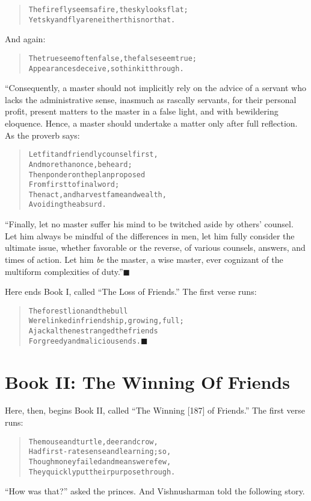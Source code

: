 \documentclass[article, twoside, 14pt]{memoir}
\newcommand{\qed}{\hfill \ensuremath{\blacksquare}}
\renewenvironment{verbatim}{%
\begin{quote}%
\vskip -10pt%
\begin{alltt}\normalfont\large}{\end{alltt}%
\end{quote}%
\vskip -10pt
} %
\begin{document}
\begin{verbatim}
The firefly seems a fire, the sky looks flat;
Yet sky and fly are neither this nor that.
\end{verbatim}
And again:

\begin{verbatim}
The true seem often false, the false seem true;
Appearances deceive, so think it through.
\end{verbatim}
“Consequently, a master should not implicitly rely on the advice of
a servant who lacks the administrative sense, inasmuch as rascally
servants, for their personal profit, present matters to the master
in a false light, and with bewildering eloquence. Hence, a master
should undertake a matter only after full reflection. As the
proverb says:

\begin{verbatim}
Let fit and friendly counsel first,
    And more than once, be heard;
Then ponder on the plan proposed
    From first to final word;
Then act, and harvest fame and wealth,
    Avoiding the absurd.
\end{verbatim}
``Finally, let no master suffer his mind to be twitched aside by others' counsel. Let him always be mindful of the differences in men, let him fully consider the ultimate issue, whether favorable or the reverse, of various counsels, answers, and times of action. Let him \emph{be} the master, a wise master, ever cognizant of the multiform complexities of duty.''\hyperref[s5]{\qed}

Here ends Book I, called ``The Loss of Friends.'' The first verse
runs:

\begin{verbatim}
The forest lion and the bull
Were linked in friendship, growing, full;
A jackal then estranged the friends
For greedy and malicious ends.\hyperref[s1]{\qed}
\end{verbatim}
\section{Book II: The Winning Of Friends}

\label{s35}

Here, then, begins Book II, called
``The Winning [187] of Friends.'' The first verse runs:

\begin{verbatim}
The mouse and turtle, deer and crow,
Had first-rate sense and learning; so,
Though money failed and means were few,
They quickly put their purpose through.
\end{verbatim}
``How was that?'' asked the princes. And Vishnusharman told the
following story.
\end{document}
